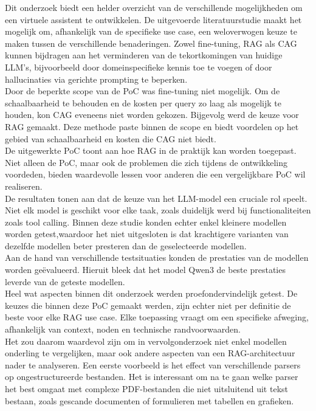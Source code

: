 Dit onderzoek biedt een helder overzicht van de verschillende mogelijkheden om een virtuele assistent te ontwikkelen. De uitgevoerde literatuurstudie maakt het mogelijk om, afhankelijk van de specifieke use case, een weloverwogen keuze te maken tussen de verschillende benaderingen. Zowel fine-tuning, RAG als CAG kunnen bijdragen aan het verminderen van de tekortkomingen van huidige LLM's, bijvoorbeeld door domeinspecifieke kennis toe te voegen of door hallucinaties via gerichte prompting te beperken.
\\[1em]
Door de beperkte scope van de PoC was fine-tuning niet mogelijk. Om de schaalbaarheid te behouden en de kosten per query zo laag als mogelijk te houden, kon CAG eveneens niet worden gekozen. Bijgevolg werd de keuze voor RAG gemaakt. Deze methode paste binnen de scope en biedt voordelen op het gebied van schaalbaarheid en kosten die CAG niet biedt.
\\[1em]
De uitgewerkte PoC toont aan hoe RAG in de praktijk kan worden toegepast. Niet alleen de PoC, maar ook de problemen die zich tijdens de ontwikkeling voordeden, bieden waardevolle lessen voor anderen die een vergelijkbare PoC wil realiseren.
\\[1em]
De resultaten tonen aan dat de keuze van het LLM-model een cruciale rol speelt. Niet elk model is geschikt voor elke taak, zoals duidelijk werd bij functionaliteiten zoals tool calling. Binnen deze studie konden echter enkel kleinere modellen worden getest,waardoor het niet uitgesloten is dat krachtigere varianten van dezelfde modellen beter presteren dan de geselecteerde modellen.
\\[1em]
Aan de hand van verschillende testsituaties konden de prestaties van de modellen worden geëvalueerd. Hieruit bleek dat het model Qwen3 de beste prestaties leverde van de geteste modellen.
\\[1em]
Heel wat aspecten binnen dit onderzoek werden proefondervindelijk getest. De keuzes die binnen deze PoC gemaakt werden, zijn echter niet per definitie de beste voor elke RAG use case. Elke toepassing vraagt om een specifieke afweging, afhankelijk van context, noden en technische randvoorwaarden.
\\[1em]
Het zou daarom waardevol zijn om in vervolgonderzoek niet enkel modellen onderling te vergelijken, maar ook andere aspecten van een RAG-architectuur nader te analyseren. Een eerste voorbeeld is het effect van verschillende parsers op ongestructureerde bestanden. Het is interessant om na te gaan welke parser het best omgaat met complexe PDF-bestanden die niet uitsluitend uit tekst bestaan, zoals gescande documenten of formulieren met tabellen en grafieken.
